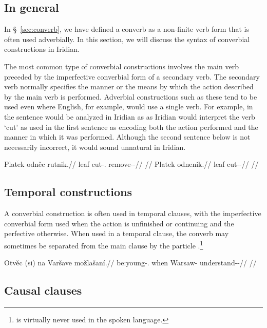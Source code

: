 \subsection{In general}

In \S~\ref{sec:converb}, we have defined a converb as a non-finite verb form
that is often used adverbially. In this section, we will discuss the syntax of
converbial constructions in Iridian.

The most common type of converbial constructions involves the main verb preceded
by the imperfective converbial form of a secondary verb. The secondary verb
normally specifies the manner or the means by which the action described by the
main verb is performed. Adverbial constructions such as these tend to be used
even where English, for example, would use a single verb. For example, in the
sentence  would be analyzed in Iridian as  as Iridian would interpret the verb `cut' as used
in the first sentence as encoding both the action performed and the manner in
which it was performed. Although the second sentence below is not necessarily
incorrect, it would sound unnatural in Iridian.

\pex
\a\begingl
  \gla Platek odněc rutnik.//
  \glb leaf cut-\Cv{}.\Ipf{} remove-\Pv{}-\Pf{}//
  \glft {}//
\endgl
\a\begingl
  \gla{}Platek odnenik.//
  \glb leaf cut-\Pv{}-\Pf{}//
  \glft {}//
\endgl
\xe

\subsection{Temporal constructions}

A converbial construction is often used in temporal clauses, with the imperfective converbial form used when the action is
unfinished or continuing and the perfective otherwise. When used in a temporal
clause, the converb may sometimes be separated from the main clause by the
particle .\footnote{ is virtually never used in the spoken
language.}

\pex
\begingl
\gla Otvěc (si) na Varšave možlašaní.//
\glb be:young-\Cv{}.\Ipf{} when \Loc{} Warsaw-\Acc{} understand-\Av{}-\Ret{}//
\glft {}//
\endgl
\xe

\subsection{Causal clauses}

